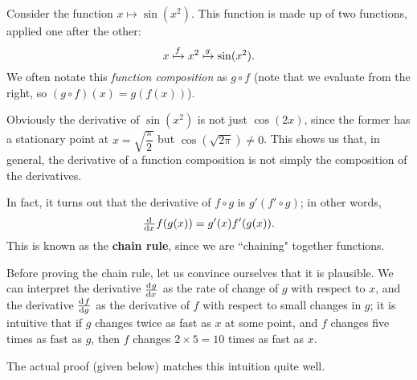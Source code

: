 


\begin{center}
\end{center}
Consider the function $ x \mapsto \sin (x^2) $. This function is made up of two
functions, applied one after the other:
\begin{displaymath}
  x \xmapsto{f} x^2 \xmapsto{g} \sin(x^2).
\end{displaymath}
We often notate this \textit{function composition} as $ g \circ f $ (note that we
evaluate from the right, so $ (g \circ f)(x) = g(f(x)) $).

Obviously the derivative of $ \sin(x^2) $ is not just $ \cos(2x) $, since the former
has a stationary point at $ x = \sqrt{\dfrac{\pi}{2}} $ but $ \cos(\sqrt{2\pi}) \neq 0 $. This
shows us that, in general, the derivative of a function composition is not simply the composition
of the derivatives.

In fact, it turns out that the derivative of $ f \circ g $ is $ g' (f' \circ g) $; in other words,
\begin{displaymath}
  \od{}{x} f(g(x)) = g'(x) f'(g(x)).
\end{displaymath}
This is known as the \textbf{chain rule}, since we are ``chaining" together functions.

Before proving the chain rule, let us convince ourselves that it is plausible. We can interpret the
derivative $ \od{g}{x} $ as the rate of change of $ g $ with respect to $ x $, and the derivative $ \od{f}{g} $
as the derivative of $ f $ with respect to small changes in $ g $; it is intuitive that if $ g $ changes
twice as fast as $ x $ at some point, and $ f $ changes five times as fast as $ g $, then $ f $ changes $ 2 \times 5 = 10 $
times as fast as $ x $.

The actual proof (given below) matches this intuition quite well.

